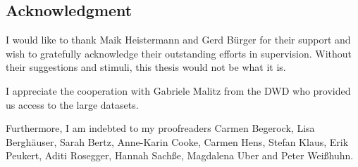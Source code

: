 \documentclass[a4paper]{article}
\begin{document}
\begin{multicols}{2}
\section*{Acknowledgment}

I would like to thank Maik Heistermann and Gerd Bürger for their support and wish to gratefully acknowledge their outstanding efforts in supervision. Without their suggestions and stimuli, this thesis would not be what it is.

I appreciate the cooperation with Gabriele Malitz from the DWD who provided us access to the large datasets.

Furthermore, I am indebted to my proofreaders Carmen Begerock, Lisa Berghäuser, Sarah Bertz, Anne-Karin Cooke, Carmen Hens, Stefan Klaus, Erik Peukert, Aditi Rosegger, Hannah Sachße, Magdalena Uber and Peter Weißhuhn.

\end{multicols}


\pagebreak
{}
\end{document}
